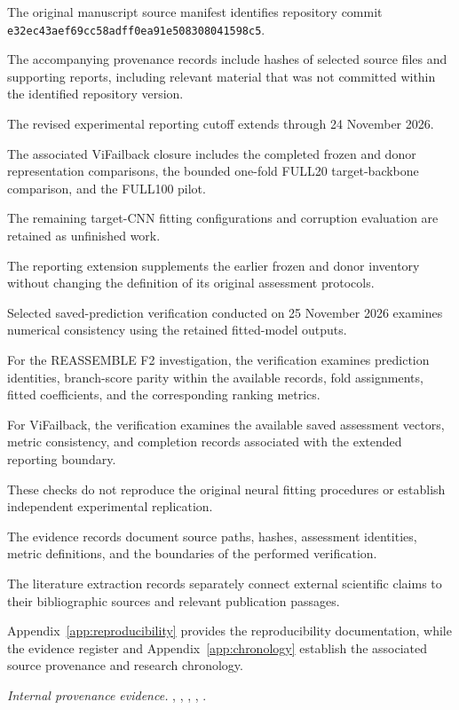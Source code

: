 The original manuscript source manifest identifies repository commit \texttt{e32ec43aef69cc58adff0ea91e508308041598c5}.

The accompanying provenance records include hashes of selected source files and supporting reports, including relevant material that was not committed within the identified repository version.

The revised experimental reporting cutoff extends through 24 November 2026.

The associated ViFailback closure includes the completed frozen and donor representation comparisons, the bounded one-fold FULL20 target-backbone comparison, and the FULL100 pilot.

The remaining target-CNN fitting configurations and corruption evaluation are retained as unfinished work.

The reporting extension supplements the earlier frozen and donor inventory without changing the definition of its original assessment protocols.

Selected saved-prediction verification conducted on 25 November 2026 examines numerical consistency using the retained fitted-model outputs.

For the REASSEMBLE F2 investigation, the verification examines prediction identities, branch-score parity within the available records, fold assignments, fitted coefficients, and the corresponding ranking metrics.

For ViFailback, the verification examines the available saved assessment vectors, metric consistency, and completion records associated with the extended reporting boundary.

These checks do not reproduce the original neural fitting procedures or establish independent experimental replication.

The evidence records document source paths, hashes, assessment identities, metric definitions, and the boundaries of the performed verification.

The literature extraction records separately connect external scientific claims to their bibliographic sources and relevant publication passages.

Appendix~\ref{app:reproducibility} provides the reproducibility documentation, while the evidence register and Appendix~\ref{app:chronology} establish the associated source provenance and research chronology.

\noindent\textit{Internal provenance evidence.} , , , , .


